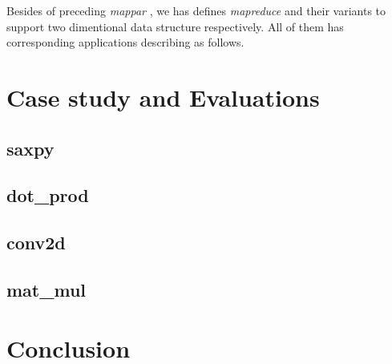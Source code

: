 \documentclass[a4paper, 11pt]{article}
\begin{document}
Besides of preceding \emph{mappar} , we has defines \emph{mapreduce} and their variants to support two dimentional data structure respectively. All of them has corresponding applications describing as follows.
\section{Case study and Evaluations}
\subsection{saxpy}
\subsection{dot\_prod}
\subsection{conv2d}
\subsection{mat\_mul}
\section{Conclusion}



\end{document}
